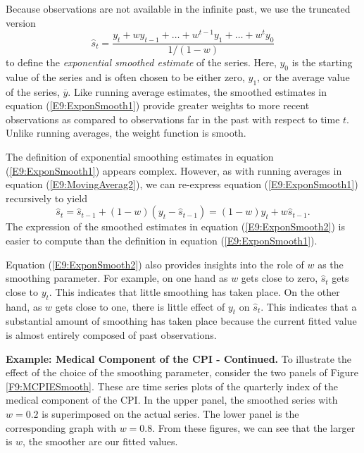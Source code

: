 Because observations are not available in the infinite past, we use
the truncated version
\begin{equation}\label{E9:ExponSmooth1}
\widehat{s}_t = \frac{y_t + w y_{t-1} + \ldots + w^{t-1} y_1 +
\ldots + w^t y_0}{1/(1-w) }
\end{equation}
to define the \emph{exponential smoothed estimate} of the series.
Here, $y_0$ is the starting value of the series and is often chosen
to be either zero, $y_1$, or the average value of the series,
$\overline{y}$. Like running average estimates, the smoothed
estimates in equation (\ref{E9:ExponSmooth1}) provide greater
weights to more recent observations as compared to observations far
in the past with respect to time $t$. Unlike running averages, the
weight function is smooth.

The definition of exponential smoothing estimates in equation
(\ref{E9:ExponSmooth1}) appears complex. However, as with running
averages in equation (\ref{E9:MovingAverag2}), we can re-express
equation (\ref{E9:ExponSmooth1}) recursively to yield
\begin{equation}\label{E9:ExponSmooth2}
\widehat{s}_t = \widehat{s}_{t-1} + (1-w)(y_t-\widehat{s}_{t-1}) =
(1-w) y_t + w \widehat{s}_{t-1}.
\end{equation}
The expression of the smoothed estimates in equation
(\ref{E9:ExponSmooth2}) is easier to compute than the definition in
equation (\ref{E9:ExponSmooth1}).

Equation (\ref{E9:ExponSmooth2}) also provides insights into the
role of $w$ as the smoothing parameter. For example, on one hand as
$w$ gets close to zero, $\widehat{s}_t$ gets close to $y_t$. This
indicates that little smoothing has taken place. On the other hand,
as $w$ gets close to one, there is little effect of $y_t$ on
$\widehat{s}_t$. This indicates that a substantial amount of
smoothing has taken place because the current fitted value is almost
entirely composed of past observations.

\linejed

\textbf{Example: Medical Component of the CPI - Continued.} To
illustrate the effect of the choice of the smoothing parameter,
consider the two panels of Figure \ref{F9:MCPIESmooth}. These are
time series plots of the quarterly index of the medical component of
the CPI. In the upper panel, the smoothed series with $ w=0.2$ is
superimposed on the actual series. The lower panel is the
corresponding graph with $w=0.8$. From these figures, we can see
that the larger is $w$, the smoother are our fitted values.


